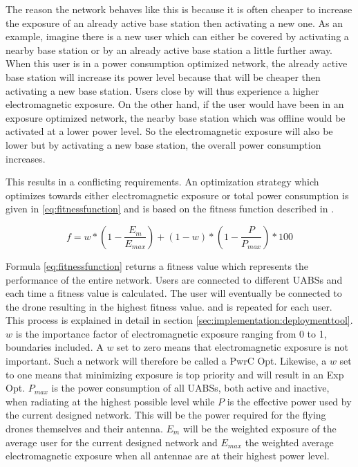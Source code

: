 The reason the network behaves like this is because it is often cheaper to increase the exposure of an already active base station 
then activating a new one. 
As an example, imagine there is a new user which can either be covered by activating a nearby base station or 
by an already active base station a little further away. When this user is in a power consumption optimized network, 
the already active base station will increase its power level because that will be cheaper then activating a new base station. 
Users close by will thus experience a higher electromagnetic exposure. On the other hand, if the user would have been in an exposure 
optimized network, the nearby base station which was offline would be activated at a lower power level. So the electromagnetic 
exposure will also be lower but by activating a new base station, the overall power consumption increases.

This results in a conflicting requirements. An optimization strategy which 
optimizes towards either electromagnetic exposure or total power consumption is given in \ref{eq:fitnessfunction} and is
based on the fitness function described in \cite{J1}.

\begin{equation} 
f = w * \left(1 - \frac{E_m}{E_{max}}\right) + (1 - w)*\left(1 - \frac{P}{P_{max}}\right) * 100
\label{eq:fitnessfunction}
\end{equation}

Formula \ref{eq:fitnessfunction} returns a fitness value which represents the performance of the entire network. Users are connected to different \gls{UABS}s and each time a fitness value is 
calculated. The user will eventually be connected to the drone resulting in the highest fitness value. 
and is repeated for each user. This process is explained in detail in section \ref{sec:implementation:deploymenttool}.
$w$ is the importance factor of electromagnetic exposure ranging from 0 to 1, boundaries included. A $w$ set to zero means that electromagnetic 
exposure is not important. Such a network will therefore be called a \gls{PwrC Opt}. 
Likewise, a $w$ set to one means that minimizing exposure is top priority and will result in an \gls{Exp Opt}. $P_{max}$ is the power consumption of all \gls{UABS}s, both active and inactive, when radiating at the highest possible level 
while $P$ is the effective power used by the current designed network. 
This will be the power required for the flying drones themselves and their antenna.
$E_m$ will be the weighted exposure of the average user for the current designed network and $E_{max}$ the weighted average electromagnetic exposure when all antennae are at their highest power level.

